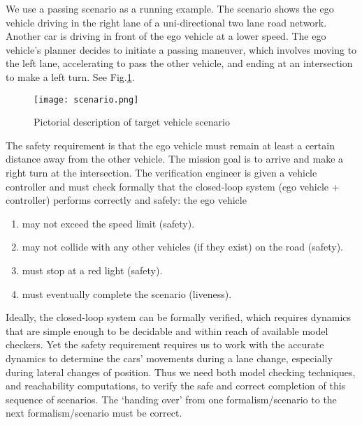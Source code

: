 \begin{exmp}
	We use a passing scenario as a running example.
	The scenario shows the ego vehicle driving in the right lane of a uni-directional two lane road network. 
	Another car is driving in front of the ego vehicle at a lower speed.
	The ego vehicle's planner decides to initiate a passing maneuver, which involves moving to the left lane, accelerating to pass the other vehicle, and ending at an intersection to make a left turn.
	See Fig.\ref{fig:scenario}.	
	\begin{figure}[tb]
		\label{fig:scenario}
		\texttt{[image: scenario.png]}
		\caption{Pictorial description of target vehicle scenario}
	\end{figure}
	The safety requirement is that the ego vehicle must remain at least a certain distance away from the other vehicle.
	The mission goal is to arrive and make a right turn at the intersection.
	The verification engineer is given a vehicle controller and must check formally that the closed-loop system (ego vehicle + controller) performs correctly and safely: the ego vehicle
		\begin{enumerate}
			\item may not exceed the speed limit (safety).
			\item may not collide with any other vehicles (if they exist) on the road (safety).
			\item must stop at a red light (safety).
			\item must eventually complete the scenario (liveness).
		\end{enumerate}
	Ideally, the closed-loop system can be formally verified, which requires dynamics that are simple enough to be decidable and within reach of available model checkers.
	Yet the safety requirement requires us to work with the accurate dynamics to determine the cars' movements during a lane change, especially during lateral changes of position. 
	Thus we need both model checking techniques, and reachability computations, to verify the safe and correct completion of this sequence of scenarios.
	The `handing over' from one formalism/scenario to the next formalism/scenario must be correct.
\end{exmp}
%
%
%
%
%

